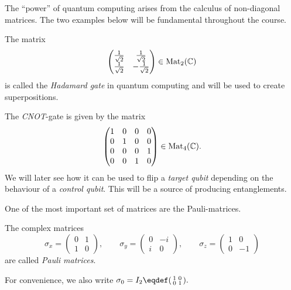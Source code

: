 \documentclass[a4paper, oneside, 12pt]{amsart}
\begin{document}
The ``power'' of quantum computing arises from the calculus of non-diagonal matrices.
The two examples below will be fundamental throughout the course.

\begin{example}\label{ex:Hadamard-and-cnot-gate}
  The  matrix
  \begin{equation*}
    \begin{pmatrix}
      \tfrac{1}{\sqrt{2}} & \tfrac{1}{\sqrt{2}} \\
      \tfrac{1}{\sqrt{2}} & -\tfrac{1}{\sqrt{2}}
    \end{pmatrix} \in \operatorname{Mat}_{2}( \mathbb{C})
  \end{equation*}
  is called the \emph{Hadamard gate} in quantum computing and will be used to create superpositions.

  The \emph{CNOT}-gate is given by the matrix
  \begin{equation*}
    \begin{pmatrix}
      1 & 0 & 0 & 0 \\
      0 & 1 & 0 & 0 \\
      0 & 0 & 0 & 1 \\
      0 & 0 & 1 & 0
    \end{pmatrix}\in \operatorname{Mat}_{4}( \mathbb{C}).
  \end{equation*}
  We will later see how it can be used to flip a \emph{target qubit} depending on the behaviour of a \emph{control qubit}.
  This will be a source of producing entanglements.
\end{example}

One of the most important set of matrices are the Pauli-matrices.
\begin{definition}\label{def:Pauli-matrices}
  The complex matrices
  \begin{equation*}
    \sigma_x =
    \begin{pmatrix}
      0& 1 \\ 1& 0
    \end{pmatrix}, \qquad
    \sigma_{y} =
    \begin{pmatrix}
      0 & -i \\ i & 0
    \end{pmatrix},\qquad
    \sigma_{z} =
    \begin{pmatrix}
      1 & 0 \\ 0 & -1
    \end{pmatrix}
  \end{equation*}
  are called \emph{Pauli matrices}.
\end{definition}
For convenience, we also write \(\sigma_{0} = I_{2}\eqdef
\begin{psmallmatrix}
  1 & 0 \\ 0 & 1
\end{psmallmatrix}.
\)
\end{document}
